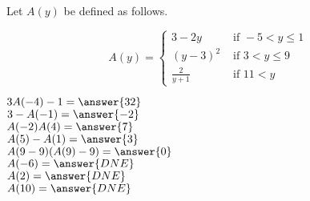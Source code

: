 \documentclass{ximera}
\author{Lee Wayand}
\begin{document}
\begin{exercise}




Let $A(y)$ be defined as follows.

\[
A(y) = 
\begin{cases}
  3 - 2y & \text{ if } -5 < y \leq 1 \\
  (y-3)^2 & \text{ if } 3 < y \leq 9 \\
  \frac{2}{y+1} & \text{ if } 11 < y 
\end{cases}
\]


$3 A(-4) - 1 = \answer{32}$ \\


$3 - A(-1)  = \answer{-2}$ \\


$A(-2) A(4) = \answer{7}$ \\


$A(5) - A(1) = \answer{3}$ \\


$A(9-9)(A(9) - 9) = \answer{0}$ \\  


$A(-6) = \answer{DNE}$ \\


$A(2) = \answer{DNE}$ \\


$A(10) = \answer{DNE}$ \\


\end{exercise}
\end{document}

